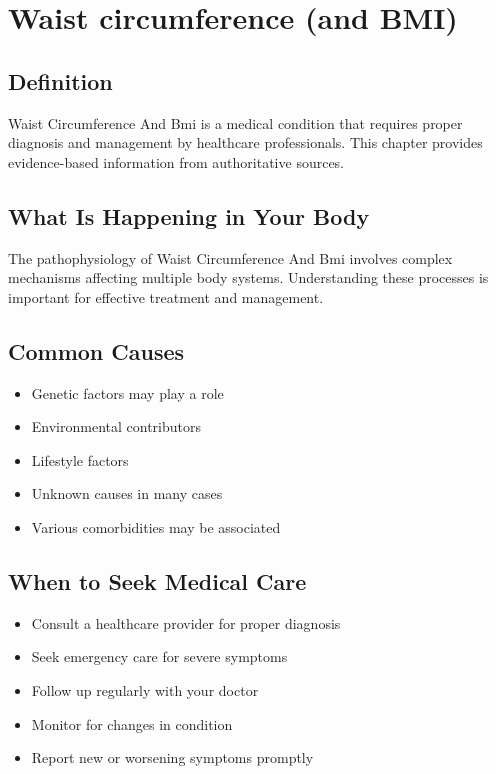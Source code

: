 
\chapter{Waist circumference (and BMI)}

\section*{Definition}
Waist Circumference And Bmi is a medical condition that requires proper diagnosis and management by healthcare professionals. This chapter provides evidence-based information from authoritative sources.

\section*{What Is Happening in Your Body}
The pathophysiology of Waist Circumference And Bmi involves complex mechanisms affecting multiple body systems. Understanding these processes is important for effective treatment and management.

\section*{Common Causes}
\begin{itemize}
  \item Genetic factors may play a role
  \item Environmental contributors
  \item Lifestyle factors
  \item Unknown causes in many cases
  \item Various comorbidities may be associated
\end{itemize}

\section*{When to Seek Medical Care}
\begin{itemize}
  \item Consult a healthcare provider for proper diagnosis
  \item Seek emergency care for severe symptoms
  \item Follow up regularly with your doctor
  \item Monitor for changes in condition
  \item Report new or worsening symptoms promptly
\end{itemize}


